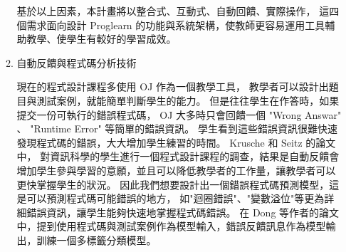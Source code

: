 \documentclass[12pt]{article}
\begin{document}
\begin{enumerate}
\begin{enumerate}
        \par 基於以上因素，本計畫將以整合式、互動式、自動回饋、實際操作，
        這四個需求面向設計 Proglearn 的功能與系統架構，使教師更容易運用工具輔助教學、使學生有較好的學習成效。

      \item 自動反饋與程式碼分析技術
        \par 現在的程式設計課程多使用 OJ 作為一個教學工具，
        教學者可以設計出題目與測試案例，就能簡單判斷學生的能力。
        但是往往學生在作答時，如果提交一份可執行的錯誤程式碼， OJ 大多時只會回饋一個 "Wrong Answar" 、 "Runtime Error" 等簡單的錯誤資訊。
        學生看到這些錯誤資訊很難快速發現程式碼的錯誤，大大增加學生練習的時間。 Krusche 和 Seitz 的論文\cite{ref16}中，
        對資訊科學的學生進行一個程式設計課程的調查，結果是自動反饋會增加學生參與學習的意願，並且可以降低教學者的工作量，讓教學者可以更快掌握學生的狀況。
        因此我們想要設計出一個錯誤程式碼預測模型，這是可以預測程式碼可能錯誤的地方，
        如"迴圈錯誤"、"變數溢位"等更為詳細錯誤資訊，讓學生能夠快速地掌握程式碼錯誤。
        在 Dong 等作者的論文\cite{ref17}中，提到使用程式碼與測試案例作為模型輸入，錯誤反饋訊息作為模型輸出，訓練一個多標籤分類模型。

    \end{enumerate}


\end{enumerate}
\end{document}
